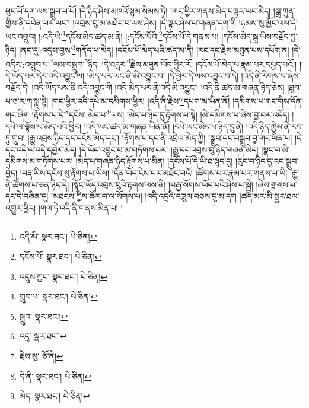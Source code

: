 ཕུང་པོ་དག་ལས་སྒྲུབ་པ་པོ། །དེ་ཉིད་ཤེས་མཁའོ་སྙམ་སེམས་ཏེ། །གང་ཕྱིར་གནས་མེད་བལྟར་ཡང་མེད། །སྒྲ་ཀུན་གྱིས་ནི་དབེན་པར་ཡང་། །འབྲས་བུ་མ་མཐོང་བ་ལས་ཤེས། །དེ་ལྟར་ཤེས་པ་གཞན་དག་གི །ཉམས་སུ་མྱོང་ལས་དེ་ཡང་འགྲུབ། །:འདི་ཡི་\footnote{འདི་མི་  སྣར་ཐང་།  པེ་ཅིན། }དངོས་མེད་ཚད་མ་ནི། །:དངོས་པོའི་\footnote{དངོས་པོ་  སྣར་ཐང་།  པེ་ཅིན། }དངོས་པོ་དེ་གནས་པ། །དངོས་མེད་སྒྲ་ཡིས་བརྗོད་བྱ་ཉིད། །ནང་དུ་:འདུས་བྱས་\footnote{འདུས་ཀྱང་  སྣར་ཐང་།  པེ་ཅིན། }གནོད་པ་མེད། །དངོས་པོ་མེད་པའི་ཚད་མ་ནི། །རང་དང་རྗེས་མཐུན་པས་དཔོག་ན། །དེ་འདིར་:འགྲུབ་པ་\footnote{གྲུབ་པ་  སྣར་ཐང་།  པེ་ཅིན། }ལས་བསྒྲུབ་\footnote{སྒྲུབ་  སྣར་ཐང་། }ཉིད། །དེ་འདྲར་\footnote{འདྲ་  སྣར་ཐང་། }རྗེས་མཐུན་ཡོད་ཕྱིར་རོ། །དངོས་པོ་མེད་པ་རྣམ་པར་དཔྱད་པའོ།། །།དེ་ཡོད་པར་དེར་འདི་འབྱུང་ལ། །མེད་པར་ཡང་ནི་མི་འབྱུང་བ། །དེ་ཕྱིར་དེ་ལས་འབྱུང་བ་དེ། །འདི་ནི་རིགས་པ་ཞེས་བརྗོད་དེ། །འདི་ཡོད་པས་ནི་འདི་འབྱུང་གི །འདི་མེད་པར་ནི་འདི་མི་འབྱུང་། །འདི་ནི་ཚད་མ་གཞན་ཉིད་ཅེས། །ཐུབ་པ་ཙ་ར་ཀ་སྨྲ་སྟེ། །གང་ཕྱིར་འདི་དཔེ་མ་དམིགས་ཕྱིར། །འདི་ནི་རྗེས་\footnote{རྗེས་སུ་  ཅོ་ནེ། }དཔག་མ་ཡིན་ནོ། །དམིགས་པ་གང་གིས་དོན་གང་ཞིག །རྟོགས་པ་དེ་\footnote{དེ་ནི་  སྣར་ཐང་།  པེ་ཅིན། }དངོས་:མེད་པ་\footnote{མེད་  སྣར་ཐང་།  པེ་ཅིན། }ལས། །མེད་པ་ཉིད་དུ་རྟོགས་པ་སྟེ། །མི་དམིགས་པ་ཞེས་བྱ་བར་འདོད། །དཔེ་ལ་ལྟོས་པ་མེད་པའི་ཕྱིར། །འདི་ཡང་ཚད་མ་གཞན་ཡིན་ནོ། །དཔེ་ཡང་མེད་པ་ཉིད་དུ་ནི། །འདི་ཉིད་ཀྱིས་ནི་རབ་ཏུ་གྲུབ། །རྒྱུ་འབྲས་ཉིད་དང་དངོས་མེད་དང་། །རྟོགས་པ་དང་ནི་འབྲེལ་མེད་ཀྱི། །སྒྲུབ་དང་བསྒྲུབ་བྱ་གང་ཡིན་པ། །དེ་དང་འདི་ལ་འདི་དབྱེར་མེད། །དེ་ཡོད་འབྱུང་བ་མ་གཏོགས་པར། །རྒྱུ་དང་འབྲས་བུ་ཉིད་གཞན་མེད། །སྣང་བ་མི་དམིགས་མ་གཏོགས་པར། །མེད་པ་གཞན་ཉིད་རྟོགས་པ་མིན། །དངོས་པོ་དེ་ཡི་ཐ་སྙད་དུ། །རུང་བ་ཉིད་དུ་རབ་སྒྲུབ་བྱེད། །བརྡ་ཡིས་དངོས་སུ་རྟོགས་པ་ཡིས། །དོན་ཡོད་ངེས་པར་མཐོང་བའོ། །ཚོགས་པར་རྣམ་པར་གནས་པ་ཡི། །རྒྱུ་ནི་ཚོགས་པ་ཅན་ཉིད་དེ། །སྟོང་ཡོད་འབྲས་བུའི་རྟགས་ལས་ནི། །བརྒྱ་སོགས་ཡོད་པའི་ཤེས་པ་སྐྱེ། །ཞེས་གྲགས་པ་དང་དེ་བཞིན་དུ། །མཐངས་ཀྱིས་ཚོར་བ་ལ་སོགས་པ། །འདི་འདྲའི་འཁྲུལ་བཅས་དུ་མ་དག །ཚད་མར་མི་སྦྱར་ཐལ་འགྱུར་ཕྱིར། །གལ་ཏེ་འདི་ནི་གནས་མིན་པ། །
